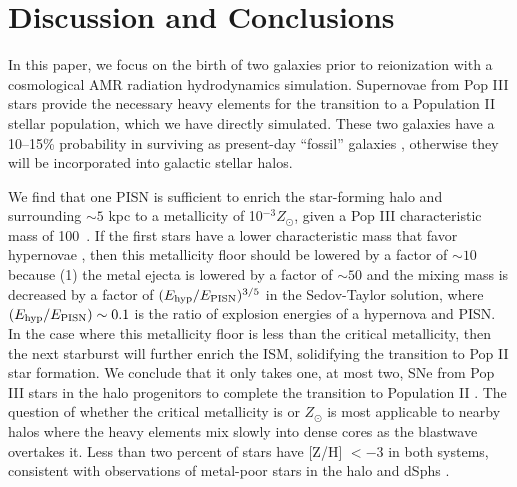 \documentclass[apjl]{emulateapj}
\begin{document}
\section{Discussion and Conclusions}

In this paper, we focus on the birth of two galaxies prior to
reionization with a cosmological AMR radiation hydrodynamics
simulation.  Supernovae from Pop III stars provide the necessary heavy
elements for the transition to a Population II stellar population,
which we have directly simulated.  These two galaxies have a 10--15\%
probability in surviving as present-day ``fossil'' galaxies
\citep{Gnedin06}, otherwise they will be incorporated into galactic
stellar halos.  

We find that one PISN is sufficient to enrich the star-forming halo
and surrounding $\sim 5$ kpc to a metallicity of 10$^{-3} Z_\odot$,
given a Pop III characteristic mass of 100~\Ms.  If the first stars
have a lower characteristic mass that favor hypernovae
\citep{Tumlinson07_IMF}, then this metallicity floor should be lowered
by a factor of $\sim 10$ because (1) the metal ejecta is lowered by a
factor of $\sim 50$ and the mixing mass is decreased by a factor of
$(E_{\rm hyp}/E_{\rm PISN})^{3/5}$ in the Sedov-Taylor solution, where
$(E_{\rm hyp}/E_{\rm PISN}) \sim 0.1$ is the ratio of explosion
energies of a hypernova and PISN.  In the case where this metallicity
floor is less than the critical metallicity, then the next starburst
will further enrich the ISM, solidifying the transition to Pop II star
formation.  We conclude that it only takes one, at most two, SNe from
Pop III stars in the halo progenitors to complete the transition to
Population II \citep[see also][]{Frebel10}.  The question of whether
the critical metallicity is  or  $Z_\odot$ is
most applicable to nearby halos where the heavy elements mix slowly
into dense cores as the blastwave overtakes it.  Less than two percent
of stars have [Z/H] $< -3$ in both systems, consistent with
observations of metal-poor stars in the halo and dSphs
\citep[e.g.][]{Beers05, Frebel10_Obs}.
\end{document}
